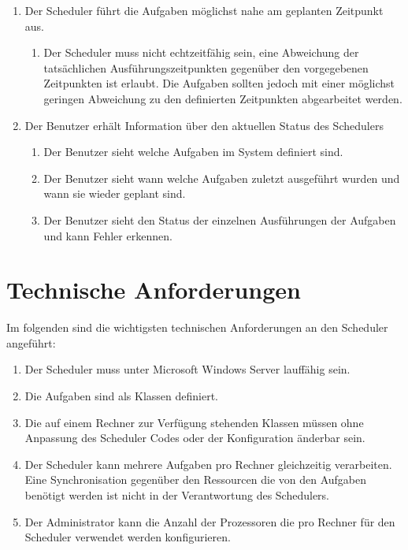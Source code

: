\begin{enumerate}
\begin{enumerate}
	\end{enumerate}
	\item Der Scheduler führt die Aufgaben möglichst nahe am geplanten Zeitpunkt aus.
	\begin{enumerate}
		\item Der Scheduler muss nicht echtzeitfähig sein, eine Abweichung der tatsächlichen Ausführungszeitpunkten gegenüber den vorgegebenen Zeitpunkten ist erlaubt. Die Aufgaben sollten jedoch mit einer möglichst geringen Abweichung zu den definierten Zeitpunkten abgearbeitet werden.
	\end{enumerate}
	\item Der Benutzer erhält Information über den aktuellen Status des Schedulers
	\begin{enumerate}
		\item Der Benutzer sieht welche Aufgaben im System definiert sind.
		\item Der Benutzer sieht wann welche Aufgaben zuletzt ausgeführt wurden und wann sie wieder geplant sind.
		\item Der Benutzer sieht den Status der einzelnen Ausführungen der Aufgaben und kann Fehler erkennen.
	\end{enumerate}
\end{enumerate}
\section{Technische Anforderungen}
Im folgenden sind die wichtigsten technischen Anforderungen an den Scheduler angeführt:
\begin{enumerate}
	\item Der Scheduler muss unter Microsoft Windows Server lauffähig sein.
	\item Die Aufgaben sind als Klassen definiert.
	\item Die auf einem Rechner zur Verfügung stehenden Klassen müssen ohne Anpassung des Scheduler Codes oder der Konfiguration änderbar sein.
	\item Der Scheduler kann mehrere Aufgaben pro Rechner gleichzeitig verarbeiten. Eine Synchronisation gegenüber den Ressourcen die von den Aufgaben benötigt werden ist nicht in der Verantwortung des Schedulers.
	\item Der Administrator kann die Anzahl der Prozessoren die pro Rechner für den Scheduler verwendet werden konfigurieren.
\end{enumerate}

\chapterend
